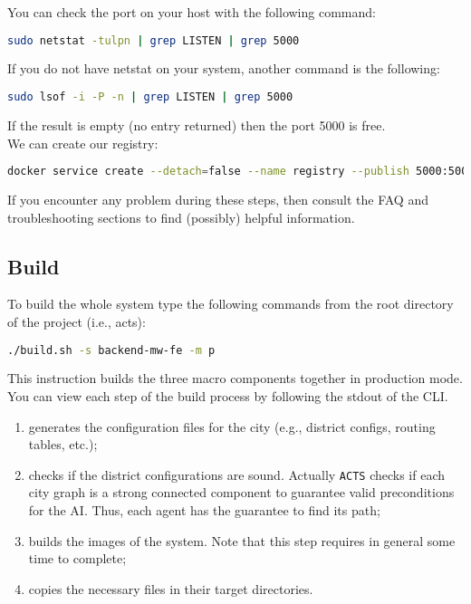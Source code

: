 You can check the port on your host with the following command:

\begin{lstlisting}[language=bash]
sudo netstat -tulpn | grep LISTEN | grep 5000
\end{lstlisting}

If you do not have netstat on your system, another command is the following:

\begin{lstlisting}[language=bash]
sudo lsof -i -P -n | grep LISTEN | grep 5000
\end{lstlisting}

If the result is empty (no entry returned) then the port 5000 is free.
\\
We can create our registry:

\begin{lstlisting}[language=bash]
docker service create --detach=false --name registry --publish 5000:5000 registry:latest
\end{lstlisting}

If you encounter any problem during these steps, then
consult the FAQ and troubleshooting sections to find (possibly)
helpful information.

\subsection{Build}

To build the whole system type the following commands from the root directory of the project (i.e., acts):

\begin{lstlisting}[language=bash]
./build.sh -s backend-mw-fe -m p
\end{lstlisting}

This instruction builds the three macro components together in production mode.
You can view each step of the build process by following the stdout of the CLI.
\begin{enumerate}
\item generates the configuration files for the city (e.g., district configs, routing tables, etc.);
\item checks if the district configurations are sound. Actually \texttt{ACTS} checks if each city
graph is a strong connected component to guarantee valid preconditions for the AI. Thus, each agent
has the guarantee to find its path;
\item builds the images of the system. Note that this step requires in general some time to complete;
\item copies the necessary files in their target directories.
\end{enumerate}

